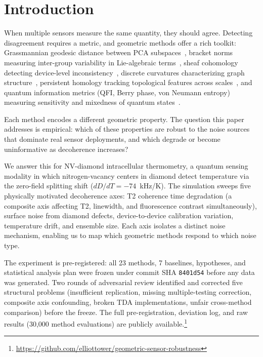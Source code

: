 \documentclass[11pt]{article}
\begin{document}
\section{Introduction}
\label{sec:intro}

When multiple sensors measure the same quantity, they should agree.
Detecting disagreement requires a metric, and geometric methods offer a
rich toolkit: Grassmannian geodesic distance between PCA
subspaces~\citep{edelman1998geometry}, bracket norms measuring
inter-group variability in Lie-algebraic
terms~\citep{tower2026bracket}, sheaf cohomology
detecting device-level inconsistency~\citep{hansen2019toward},
discrete curvatures characterizing graph
structure~\citep{ollivier2009ricci,forman2003bochner},
persistent homology tracking topological features across
scales~\citep{carlsson2009topology}, and quantum information
metrics (QFI, Berry phase, von Neumann entropy) measuring sensitivity
and mixedness of quantum states~\citep{braunstein1994statistical}.

Each method encodes a different geometric property.  The question this
paper addresses is empirical: which of these properties are robust to
the noise sources that dominate real sensor deployments, and which
degrade or become uninformative as decoherence increases?

We answer this for NV-diamond intracellular thermometry, a quantum
sensing modality in which nitrogen-vacancy centers in diamond detect
temperature via the zero-field splitting shift ($dD/dT = -74$~kHz/K).
The simulation sweeps five physically motivated decoherence axes: T2
coherence time degradation (a composite axis affecting T2, linewidth,
and fluorescence contrast simultaneously), surface noise from diamond
defects, device-to-device calibration variation, temperature drift, and
ensemble size.  Each axis isolates a distinct noise mechanism, enabling
us to map which geometric methods respond to which noise type.

The experiment is pre-registered: all 23 methods, 7 baselines,
hypotheses, and statistical analysis plan were frozen under commit SHA
\texttt{8401d54} before any data was generated.  Two rounds of
adversarial review identified and corrected five structural problems
(insufficient replication, missing multiple-testing correction, composite
axis confounding, broken TDA implementations, unfair cross-method
comparison) before the freeze.  The full pre-registration, deviation
log, and raw results (30,000 method evaluations) are publicly
available.\footnote{\url{https://github.com/elliottower/geometric-sensor-robustness}}
\end{document}
